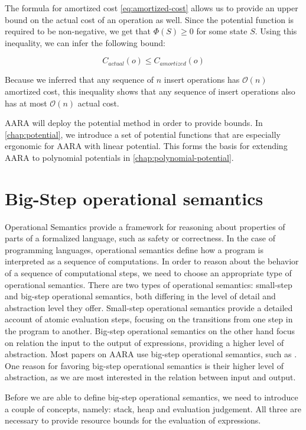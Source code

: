 The formula for amortized cost \ref{eq:amortized-cost} allows us to provide an upper bound on the actual cost of an operation as well. Since the potential function is required to be non-negative, we get that \(\Phi(S) \geq 0\) for some state \(S\). Using this inequality, we can infer the following bound: 

\[C_{actual}(o) \leq C_{amortized}(o)\]
\label{ineq:actual-amortized}

Because we inferred that any sequence of \(n\) insert operations has \(\mathcal{O}(n)\) amortized cost, this inequality shows that any sequence of insert operations also has at most \(\mathcal{O}(n)\) actual cost.

AARA will deploy the potential method in order to provide bounds. In \ref{chap:potential}, we introduce a set of potential functions that are especially ergonomic for AARA with linear potential.
 This forms the basis for extending AARA to polynomial potentials in \ref{chap:polynomial-potential}.

\section{Big-Step operational semantics}
Operational Semantics provide a framework for reasoning about properties of parts of a formalized language, such as safety or correctness. In the case of programming languages, operational semantics define how a program is interpreted as a sequence of computations. In order to reason about the behavior of a sequence of computational steps, we need to choose an appropriate type of operational semantics.
There are two types of operational semantics: small-step and big-step operational semantics, both differing in the level of detail and abstraction level they offer. Small-step operational semantics provide a detailed account of atomic evaluation steps, focusing on the transitions from one step in the program to another. Big-step operational semantics on the other hand focus on relation the input to the output of expressions, providing a higher level of abstraction. Most papers on AARA use big-step operational semantics, such as . One reason for favoring big-step operational semantics is their higher level of abstraction, as we are most interested in the relation between input and output.

Before we are able to define big-step operational semantics, we need to introduce a couple of concepts, namely: stack, heap and evaluation judgement. All three are necessary to provide resource bounds for the evaluation of expressions.

